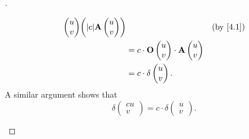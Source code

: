 \begin{proof}[]
\begin{enumerate}
\begin{align*}
{\begin{pmatrix}
                                                                          u \\
                                                                          v
                                                                        \end{pmatrix}} \pa{\abs{c} \mathbf{A}\begin{pmatrix}
                                                                                                               u \\
                                                                                                               v
                                                                                                             \end{pmatrix}} &  & \by{4.1} \\
                                  & = c \cdot \mathbf{O}\begin{pmatrix}
                                                          u \\
                                                          v
                                                        \end{pmatrix} \cdot \mathbf{A}\begin{pmatrix}
                                                                                        u \\
                                                                                        v
                                                                                      \end{pmatrix}                                    \\
                                  & = c \cdot \delta\begin{pmatrix}
                                                      u \\
                                                      v
                                                    \end{pmatrix}.
          \end{align*}
          A similar argument shows that
          \[
            \delta\begin{pmatrix}
              cu \\
              v
            \end{pmatrix} = c \cdot \delta\begin{pmatrix}
              u \\
              v
            \end{pmatrix}.
          \]


\end{enumerate}
\end{proof}
